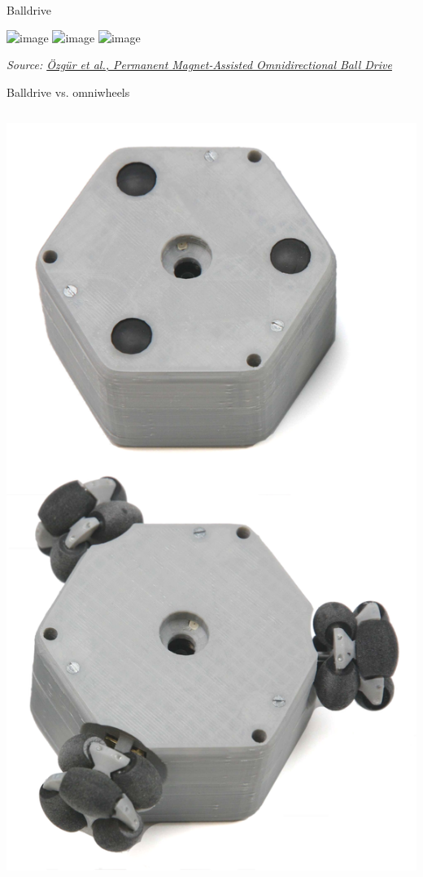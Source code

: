 \documentclass[compress]{beamer}
\newcommand{\source}[2]{{\tiny\it Source: \href{#1}{#2}}}
\begin{document}
\begin{frame}{Balldrive}
    \begin{center}
        \includegraphics<1>[width=0.9\linewidth]{balldrive-cellulo}
        \includegraphics<2>[width=0.9\linewidth]{magnetic_ball_drive}
        \includegraphics<3>[width=0.9\linewidth]{balldrive-cellulo-model}

        \source{http://ayberkozgur.com/_media/publications:balldrive.pdf}{\"Ozg\"ur et al., Permanent Magnet-Assisted Omnidirectional Ball Drive}
    \end{center}
\end{frame}


\begin{frame}{Balldrive vs. omniwheels}
    \begin{columns}
        \begin{column}{0.4\linewidth}
            \begin{center}
                \includegraphics[width=0.8\linewidth]{balldrive-omniwheel}

\end{center}
\end{column}
\end{columns}
\end{frame}
\end{document}
